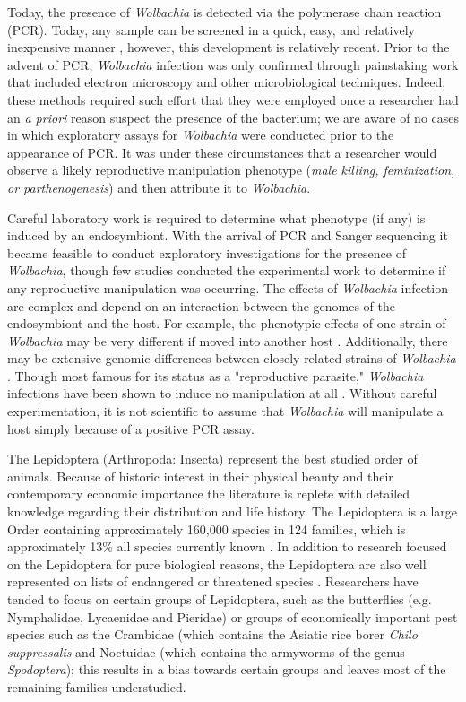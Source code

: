 \documentclass[12pt]{article}
\begin{document}
Today, the presence of \textit{Wolbachia} is detected via the polymerase chain reaction (PCR). Today, any sample can be screened in a quick, easy, and relatively inexpensive manner \citep{Baldo:2006p7025,Simoes:2011p11073}, however, this development is relatively recent. Prior to the advent of PCR, \textit{Wolbachia} infection was only confirmed through painstaking work that included electron microscopy and other microbiological techniques. Indeed, these methods required such effort that they were employed once a researcher had an \textit{a priori} reason suspect the presence of the bacterium; we are aware of no cases in which exploratory assays for \textit{Wolbachia} were conducted prior to the appearance of PCR. It was under these circumstances that a researcher would observe a likely reproductive manipulation phenotype (\emph{male killing, feminization, \emph{or} parthenogenesis}) and then attribute it to \textit{Wolbachia}.

Careful laboratory work is required to determine what phenotype (if any) is induced by an endosymbiont. With the arrival of PCR and Sanger sequencing it became feasible to conduct exploratory investigations for the presence of \textit{Wolbachia}, though few studies conducted the experimental work to determine if any reproductive manipulation was occurring. The effects of \textit{Wolbachia} infection are complex and depend on an interaction between the genomes of the endosymbiont and the host. For example, the phenotypic effects of one strain of \textit{Wolbachia} may be very different if moved into another host \citep{Rigaud:2001fv,Hoffmann:2011p11474}. Additionally, there may be extensive genomic differences between closely related strains of \textit{Wolbachia} \citep{Ishmael:2009p8257}. Though most famous for its status as a "reproductive parasite," \textit{Wolbachia} infections have been shown to induce no manipulation at all \citep{Hamm:2014cv,Zhang:2010jl,Zhang:2013eo}. Without careful experimentation, it is not scientific to assume that \textit{Wolbachia} will manipulate a host simply because of a positive PCR assay. 

The Lepidoptera (Arthropoda: Insecta) represent the best studied order of animals. Because of historic interest in their physical beauty and their contemporary economic importance the literature is replete with detailed knowledge regarding their distribution and life history. The  Lepidoptera is a large Order containing approximately 160,000 species in 124 families, which is approximately 13\% all species currently known \cite{Regier:2013fp}. In addition to research focused on the Lepidoptera for pure biological reasons, the Lepidoptera are also well represented on lists of endangered or threatened species \citep{Hamm:2014wi}. Researchers have tended to focus on certain groups of Lepidoptera, such as the butterflies (e.g. Nymphalidae, Lycaenidae and Pieridae) or groups of economically important pest species such as the Crambidae (which contains the Asiatic rice borer \textit{Chilo suppressalis} and Noctuidae (which contains the armyworms of the genus \textit{Spodoptera}); this results in a bias towards certain groups and leaves most of the remaining families understudied. 
\end{document}
